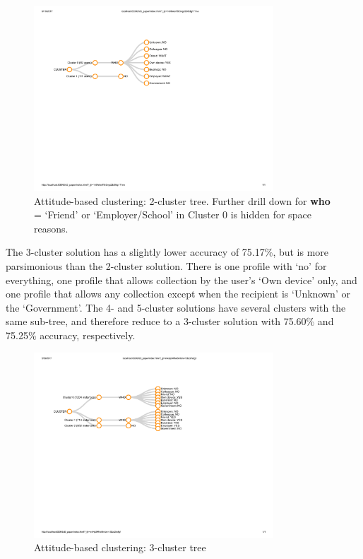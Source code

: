 \begin{figure}
	\centering
	\includegraphics[width=0.8\textwidth]{figures/attitude-based-2.pdf}
	\caption{Attitude-based clustering: 2-cluster tree. Further drill down for \textbf{who} = `Friend' or `Employer/School' in Cluster 0 is hidden for space reasons.}
	\label{fig:2clusters}
\end{figure}

The 3-cluster solution has a slightly lower accuracy of 75.17\%, but is more parsimonious than the 2-cluster solution. There is one profile with `no' for everything, one profile that allows collection by the user's `Own device' only, and one profile that allows any collection except when the recipient is `Unknown' or the `Government'. The 4- and 5-cluster solutions have several clusters with the same sub-tree, and therefore reduce to a 3-cluster solution with 75.60\% and 75.25\% accuracy, respectively.


\begin{figure}
	\centering
	\includegraphics[width=0.8\textwidth]{figures/attitude-based-3.pdf}
	\caption{Attitude-based clustering: 3-cluster tree}
	\label{fig:3clusters}
\end{figure}


